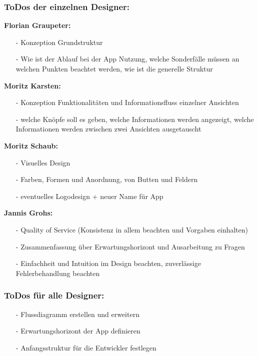 \documentclass[12pt,a4paper]{article}
\begin{document}
\subsubsection*{ToDos der einzelnen Designer:}
\textbf{Florian Graupeter:}
\begin{itemize}
\item[-]Konzeption Grundstruktur
\item[-]Wie ist der Ablauf bei der App Nutzung, welche Sonderfälle müssen an welchen Punkten beachtet werden, wie ist die generelle Struktur
\end{itemize}
\textbf{Moritz Karsten:}
\begin{itemize}
\item[-]Konzeption Funktionalitäten und Informationsfluss einzelner Ansichten
\item[-]welche Knöpfe soll es geben, welche Informationen werden angezeigt, welche Informationen werden zwischen zwei Ansichten ausgetauscht
\end{itemize}
\textbf{Moritz Schaub:}
\begin{itemize}
\item[-]Visuelles Design
\item[-]Farben, Formen und Anordnung, von Butten und Feldern 
\item[-]eventuelles Logodesign + neuer Name für App
\end{itemize}
\textbf{Jannis Grohs:}
\begin{itemize}
\item[-]Quality of Service (Konsistenz in allem beachten und Vorgaben einhalten)
\item[-]Zusammenfassung über Erwartungshorizont und Ausarbeitung zu Fragen
\item[-]Einfachheit und Intuition im Design beachten, zuverlässige Fehlerbehandlung beachten
\end{itemize}
\subsubsection*{ToDos für alle Designer:}
\begin{itemize}
\item[-]Flussdiagramm erstellen und erweitern
\item[-]Erwartungshorizont der App definieren
\item[-]Anfangsstruktur für die Entwickler festlegen
\end{itemize}
\newpage
\end{document}
